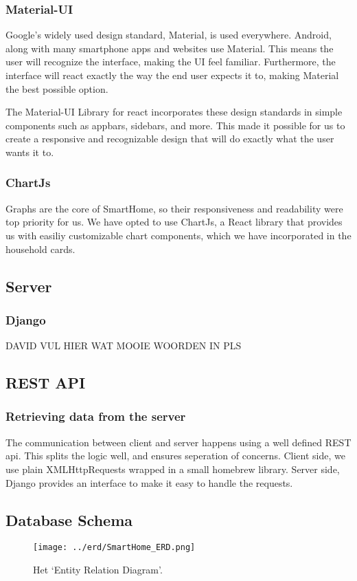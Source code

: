\documentclass[11pt]{article}
\begin{document}
	\subsubsection{Material-UI}
		Google's widely used design standard, Material, is used everywhere. Android, along with many smartphone apps and websites use Material.
		This means the user will recognize the interface, making the UI feel familiar.
		Furthermore, the interface will react exactly the way the end user expects it to, making Material the best possible option.

		The Material-UI Library for react incorporates these design standards in simple components such as appbars, sidebars, and more.
		This made it possible for us to create a responsive and recognizable design that will do exactly what the user wants it to.
		
	\subsubsection{ChartJs}
		Graphs are the core of SmartHome, so their responsiveness and readability were top priority for us.
		We have opted to use ChartJs, a React library that provides us with easiliy customizable chart components,
		which we have incorporated in the household cards. 
		
  \subsection{Server}
	\subsubsection{Django}
		DAVID VUL HIER WAT MOOIE WOORDEN IN PLS

  \subsection{REST API}
	\subsubsection{Retrieving data from the server}
		The communication between client and server happens using a well defined REST api. This splits the logic well, and ensures seperation of concerns.
		Client side, we use plain XMLHttpRequests wrapped in a small homebrew library. Server side, Django provides an interface to make it easy to handle the requests.

  \subsection{Database Schema}
  \begin{figure}[H]
  \centering
    \texttt{[image: ../erd/SmartHome\_ERD.png]}
  \caption{Het `Entity Relation Diagram'.}
  \label{fig:erd}
  \end{figure}
  
\end{document}
